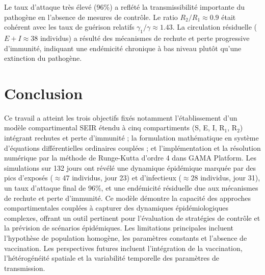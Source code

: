 \documentclass[11pt]{article}
\begin{document}
Le taux d'attaque très élevé (96\%) a reflété la transmissibilité importante du pathogène en l'absence de mesures de contrôle. Le ratio $R_2/R_1 \approx 0.9$ était cohérent avec les taux de guérison relatifs $\gamma_1/\gamma \approx 1.43$. La circulation résiduelle ($E+I \approx 38$ individus) a résulté des mécanismes de rechute et perte progressive d'immunité, indiquant une endémicité chronique à bas niveau plutôt qu'une extinction du pathogène.

\section{Conclusion}\label{sec:conclusion}
Ce travail a atteint les trois objectifs fixés notamment l'établissement d'un modèle compartimental SEIR étendu à cinq compartiments (S, E, I, R$_1$, R$_2$) intégrant rechutes et perte d'immunité ; la formulation mathématique en système d'équations différentielles ordinaires couplées ; et l'implémentation et la résolution numérique par la méthode de Runge-Kutta d'ordre 4 dans GAMA Platform. Les simulations sur 132 jours ont révélé une dynamique épidémique marquée par des pics d'exposés ($\approx 47$ individus, jour 23) et d'infectieux ($\approx 28$ individus, jour 31), un taux d'attaque final de 96\%, et une endémicité résiduelle due aux mécanismes de rechute et perte d'immunité. Ce modèle démontre la capacité des approches compartimentales couplées à capturer des dynamiques épidémiologiques complexes, offrant un outil pertinent pour l'évaluation de stratégies de contrôle et la prévision de scénarios épidémiques. Les limitations principales incluent l'hypothèse de population homogène, les paramètres constants et l'absence de vaccination. Les perspectives futures incluent l'intégration de la vaccination, l'hétérogénéité spatiale et la variabilité temporelle des paramètres de transmission.





\newpage
\end{document}
